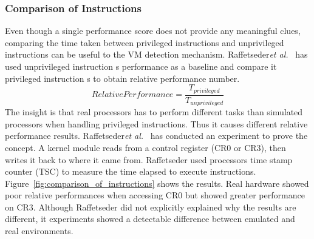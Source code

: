 \subsubsection{Comparison of Instructions}
Even though a single performance score does not provide any meaningful clues, comparing the time taken between privileged instructions and unprivileged instructions can be useful to the VM detection mechanism. Raffetseder{\em et al.}~\cite{raffetseder2007} has used unprivileged instruction \textquotesingle s performance as a baseline and compare it privileged instruction \textquotesingle s to obtain relative performance number.
\begin{equation*}
Relative Performance = \frac{T_{privileged}}{T_{unprivileged}}
\end{equation*}
The insight is that real processors has to perform different tasks than simulated processors when handling privileged instructions. Thus it causes different relative performance results.  Raffetseder{\em et al.}~\cite{raffetseder2007} has conducted an experiment to prove the concept. A kernel module reads from a control register (CR0 or CR3), then writes it back to where it came from. Raffetseder used processor\textquotesingle s time stamp counter (TSC) to measure the time elapsed to execute instructions. Figure~\ref{fig:comparison_of_instructions} shows the results. Real hardware showed poor relative performances when accessing CR0 but showed greater performance on CR3. Although Raffetseder did not explicitly explained why the results are different, it experiments showed a detectable difference between emulated and real environments.


